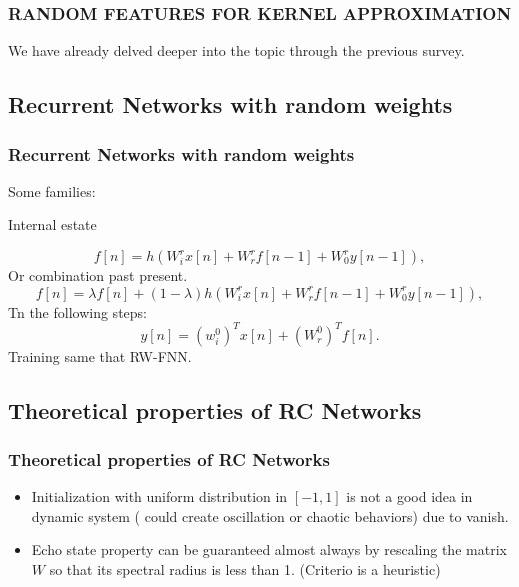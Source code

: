 \begin{frame}
    \frametitle{RANDOM FEATURES FOR KERNEL
    APPROXIMATION}

    We have already delved deeper into the topic through the previous survey.
\end{frame}
\subsection{Recurrent Networks with random weights}
\begin{frame}
    \frametitle{Recurrent Networks with random weights}

    Some families: 

    Internal estate 

    \begin{equation}
        f[n] = h(W^r_i x[n] + W^r_r f[n-1] + W^r_0 y[n-1]),
    \end{equation}
    Or combination past present. 
    \begin{equation}
        f[n] =\lambda f[n] +
         (1-\lambda)h(W^r_i x[n] + W^r_r f[n-1] + W^r_0 y[n-1]),
    \end{equation}
    Tn the following steps: 
    \begin{equation}
        y[n]
        = 
        (w^0_i)^T x[n]
        + (W^0_r)^T f[n].
    \end{equation}
Training same that RW-FNN.
\end{frame}

\subsection{Theoretical properties of RC Networks}
\begin{frame}
    \frametitle{Theoretical properties of RC Networks}

    \begin{itemize}
        \item Initialization with uniform distribution in $[-1,1]$ is not a good idea in dynamic system ( could create oscillation or chaotic behaviors) due to vanish.
        \item Echo state property can be guaranteed almost always by rescaling the matrix $W$ so that its spectral radius is less than 1. (Criterio is a heuristic)
    \end{itemize}

\end{frame}


